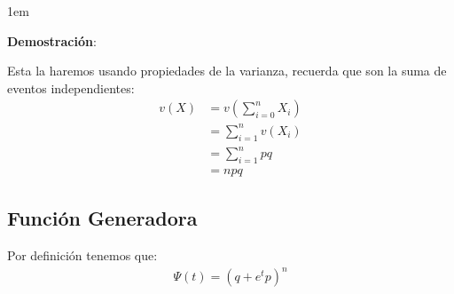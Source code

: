 \documentclass[12pt, fleqn]{report}                             %
\newenvironment{SmallIndentation}[1][0.75em]                    %
        {\begin{adjustwidth}{#1}{}\begin{footnotesize}}             %
        {\end{footnotesize}\end{adjustwidth}}                       %
\theoremstyle{break}                                            %
\newcommand{\Wrap}[1]{\left( #1 \right)}                        %
\begin{document}
                \begin{SmallIndentation}[1em]
                    \textbf{Demostración}:
                    
                    Esta la haremos usando propiedades de la varianza, recuerda que
                    son la suma de eventos independientes:
                    \begin{align*}
                        v(X) 
                            &= v\Wrap{\sum_{i=0}^n X_i}         \\
                            &= \sum_{i=1}^n v(X_i)              \\
                            &= \sum_{i=1}^n pq                  \\
                            &= npq
                    \end{align*}
                
                \end{SmallIndentation}
                   
            \vspace{1em}
            \subsection{Función Generadora}  

                Por definición tenemos que:
                \begin{align*}
                    \Psi (t) = \Wrap{q + e^tp}^n   
                \end{align*}
\end{document}
